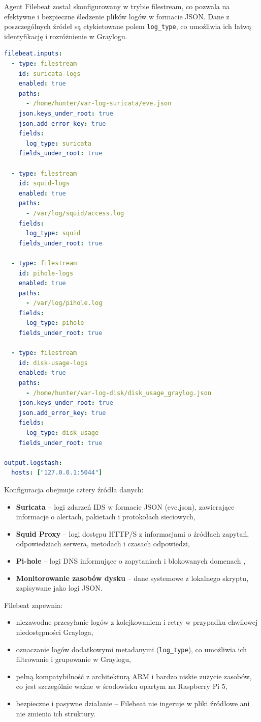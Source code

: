 \documentclass[
    left=2.5cm,         %
    right=2.5cm,        %
    top=2.5cm,          %
    bottom=3cm,         %
    bindingoffset=6mm,  %
    nohyphenation=true %
]{eiti/eiti-thesis} %
\begin{document}
Agent Filebeat został skonfigurowany w trybie filestream, co pozwala na efektywne i bezpieczne śledzenie plików logów w formacie JSON. Dane z poszczególnych źródeł są etykietowane polem \texttt{log\_type}, co umożliwia ich łatwą identyfikację i rozróżnienie w Graylogu.

\begin{lstlisting}[language=yaml, caption={Przykładowa konfiguracja Filebeat (filebeat.yml)}, label={lst:filebeat-config}]
filebeat.inputs:
  - type: filestream
    id: suricata-logs
    enabled: true
    paths:
      - /home/hunter/var-log-suricata/eve.json
    json.keys_under_root: true
    json.add_error_key: true
    fields:
      log_type: suricata
    fields_under_root: true

  - type: filestream
    id: squid-logs
    enabled: true
    paths:
      - /var/log/squid/access.log
    fields:
      log_type: squid
    fields_under_root: true

  - type: filestream
    id: pihole-logs
    enabled: true
    paths:
      - /var/log/pihole.log
    fields:
      log_type: pihole
    fields_under_root: true

  - type: filestream
    id: disk-usage-logs
    enabled: true
    paths:
      - /home/hunter/var-log-disk/disk_usage_graylog.json
    json.keys_under_root: true
    json.add_error_key: true
    fields:
      log_type: disk_usage
    fields_under_root: true

output.logstash:
  hosts: ["127.0.0.1:5044"]
\end{lstlisting}

Konfiguracja obejmuje cztery źródła danych:
\begin{itemize}
    \item \textbf{Suricata} – logi zdarzeń IDS w formacie JSON (eve.json), zawierające informacje o alertach, pakietach i protokołach sieciowych,
    \item \textbf{Squid Proxy} – logi dostępu HTTP/S z informacjami o źródłach zapytań, odpowiedziach serwera, metodach i czasach odpowiedzi,
    \item \textbf{Pi-hole} – logi DNS informujące o zapytaniach i blokowanych domenach ,
    \item \textbf{Monitorowanie zasobów dysku} – dane systemowe z lokalnego skryptu, zapisywane jako logi JSON.
\end{itemize}

Filebeat zapewnia:
\begin{itemize}
    \item niezawodne przesyłanie logów z kolejkowaniem i retry w przypadku chwilowej niedostępności Grayloga,
    \item oznaczanie logów dodatkowymi metadanymi (\texttt{log\_type}), co umożliwia ich filtrowanie i grupowanie w Graylogu,
    \item pełną kompatybilność z architekturą ARM i bardzo niskie zużycie zasobów, co jest szczególnie ważne w środowisku opartym na Raspberry Pi 5,
    \item bezpieczne i pasywne działanie – Filebeat nie ingeruje w pliki źródłowe ani nie zmienia ich struktury.
\end{itemize}
\end{document}
